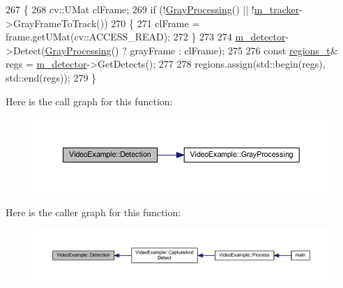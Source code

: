 \begin{DoxyCode}
267 \{
268     cv::UMat clFrame;
269     \textcolor{keywordflow}{if} (!\mbox{\hyperlink{class_video_example_af8ea44f17711129d2b954d1f01fee1f0}{GrayProcessing}}() || !\mbox{\hyperlink{class_video_example_a7c58cd8c883981b2e645d1a3d8edf76a}{m\_tracker}}->GrayFrameToTrack())
270     \{
271         clFrame = frame.getUMat(cv::ACCESS\_READ);
272     \}
273 
274     \mbox{\hyperlink{class_video_example_a00fee4b18b68d605b87051f3bdaa1c92}{m\_detector}}->Detect(\mbox{\hyperlink{class_video_example_af8ea44f17711129d2b954d1f01fee1f0}{GrayProcessing}}() ? grayFrame : clFrame);
275 
276     \textcolor{keyword}{const} \mbox{\hyperlink{defines_8h_a01db0de56a20f4342820a093c5154536}{regions\_t}}& regs = \mbox{\hyperlink{class_video_example_a00fee4b18b68d605b87051f3bdaa1c92}{m\_detector}}->GetDetects();
277 
278     regions.assign(std::begin(regs), std::end(regs));
279 \}
\end{DoxyCode}
Here is the call graph for this function\+:
\nopagebreak
\begin{figure}[H]
\begin{center}
\leavevmode
\includegraphics[width=350pt]{class_video_example_a5ea4a212997371399b01aed1d59a80b8_cgraph}
\end{center}
\end{figure}
Here is the caller graph for this function\+:
\nopagebreak
\begin{figure}[H]
\begin{center}
\leavevmode
\includegraphics[width=350pt]{class_video_example_a5ea4a212997371399b01aed1d59a80b8_icgraph}
\end{center}
\end{figure}
\mbox{\label{class_video_example_a53eb15977cb147dac218d8ea337986cd}} 
